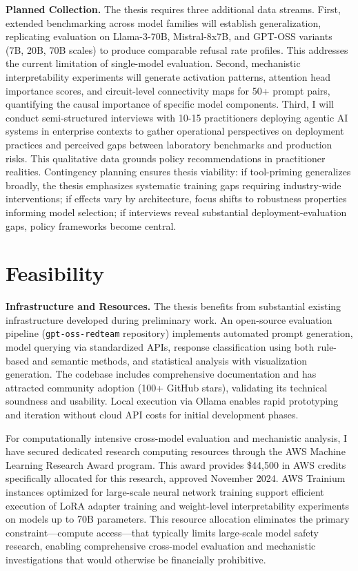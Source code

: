 \documentclass[10pt]{article}
\begin{document}
\textbf{Planned Collection.} The thesis requires three additional data streams. First, extended benchmarking across model families will establish generalization, replicating evaluation on Llama-3-70B, Mistral-8x7B, and GPT-OSS variants (7B, 20B, 70B scales) to produce comparable refusal rate profiles. This addresses the current limitation of single-model evaluation. Second, mechanistic interpretability experiments will generate activation patterns, attention head importance scores, and circuit-level connectivity maps for 50+ prompt pairs, quantifying the causal importance of specific model components. Third, I will conduct semi-structured interviews with 10-15 practitioners deploying agentic AI systems in enterprise contexts to gather operational perspectives on deployment practices and perceived gaps between laboratory benchmarks and production risks. This qualitative data grounds policy recommendations in practitioner realities. Contingency planning ensures thesis viability: if tool-priming generalizes broadly, the thesis emphasizes systematic training gaps requiring industry-wide interventions; if effects vary by architecture, focus shifts to robustness properties informing model selection; if interviews reveal substantial deployment-evaluation gaps, policy frameworks become central.

\section{Feasibility}

\textbf{Infrastructure and Resources.} The thesis benefits from substantial existing infrastructure developed during preliminary work. An open-source evaluation pipeline (\texttt{gpt-oss-redteam} repository) implements automated prompt generation, model querying via standardized APIs, response classification using both rule-based and semantic methods, and statistical analysis with visualization generation. The codebase includes comprehensive documentation and has attracted community adoption (100+ GitHub stars), validating its technical soundness and usability. Local execution via Ollama enables rapid prototyping and iteration without cloud API costs for initial development phases.

For computationally intensive cross-model evaluation and mechanistic analysis, I have secured dedicated research computing resources through the AWS Machine Learning Research Award program. This award provides \$44,500 in AWS credits specifically allocated for this research, approved November 2024. AWS Trainium instances optimized for large-scale neural network training support efficient execution of LoRA adapter training and weight-level interpretability experiments on models up to 70B parameters. This resource allocation eliminates the primary constraint—compute access—that typically limits large-scale model safety research, enabling comprehensive cross-model evaluation and mechanistic investigations that would otherwise be financially prohibitive.
\end{document}
